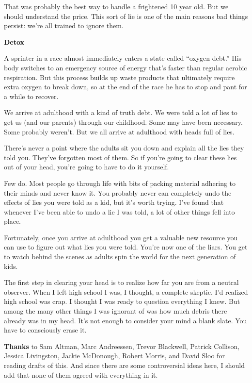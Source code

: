 That was probably the best way to handle a frightened 10 year old. But
we should understand the price. This sort of lie is one of the main
reasons bad things persist: we're all trained to ignore them.

\textbf{Detox}

A sprinter in a race almost immediately enters a state called ``oxygen
debt.'' His body switches to an emergency source of energy that's faster
than regular aerobic respiration. But this process builds up waste
products that ultimately require extra oxygen to break down, so at the
end of the race he has to stop and pant for a while to recover.

We arrive at adulthood with a kind of truth debt. We were told a lot of
lies to get us (and our parents) through our childhood. Some may have
been necessary. Some probably weren't. But we all arrive at adulthood
with heads full of lies.

There's never a point where the adults sit you down and explain all the
lies they told you. They've forgotten most of them. So if you're going
to clear these lies out of your head, you're going to have to do it
yourself.

Few do. Most people go through life with bits of packing material
adhering to their minds and never know it. You probably never can
completely undo the effects of lies you were told as a kid, but it's
worth trying. I've found that whenever I've been able to undo a lie I
was told, a lot of other things fell into place.

Fortunately, once you arrive at adulthood you get a valuable new
resource you can use to figure out what lies you were told. You're now
one of the liars. You get to watch behind the scenes as adults spin the
world for the next generation of kids.

The first step in clearing your head is to realize how far you are from
a neutral observer. When I left high school I was, I thought, a complete
skeptic. I'd realized high school was crap. I thought I was ready to
question everything I knew. But among the many other things I was
ignorant of was how much debris there already was in my head. It's not
enough to consider your mind a blank slate. You have to consciously
erase it.


\textbf{Thanks} to Sam Altman, Marc Andreessen, Trevor Blackwell,
Patrick Collison, Jessica Livingston, Jackie McDonough, Robert Morris,
and David Sloo for reading drafts of this. And since there are some
controversial ideas here, I should add that none of them agreed with
everything in it.
